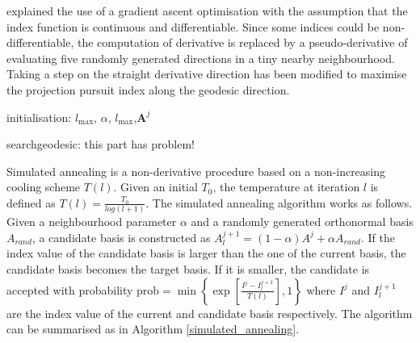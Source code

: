 \documentclass[12pt]{article}
\begin{document}
\citet{cook1995grand} explained the use of a gradient ascent
optimisation with the assumption that the index function is continuous
and differentiable. Since some indices could be non-differentiable, the
computation of derivative is replaced by a pseudo-derivative of
evaluating five randomly generated directions in a tiny nearby
neighbourhood. Taking a step on the straight derivative direction has
been modified to maximise the projection pursuit index along the
geodesic direction.

\newpage
\begin{algorithm}[H]
\SetAlgoLined
  initialisation: $l_{\max}$, $\alpha$, $l_{\max}$,$\mathbf{A}^j$\;
  \caption{searchgeodesic: this part has problem!}
  \label{search_geodesic}
\end{algorithm}

Simulated annealing
\citep[\citet{kirkpatrick1983optimization}]{bertsimas1993simulated} is a
non-derivative procedure based on a non-increasing cooling scheme
\(T(l)\). Given an initial \(T_0\), the temperature at iteration \(l\)
is defined as \(T(l) = \frac{T_0}{log(l + 1)}\). The simulated annealing
algorithm works as follows. Given a neighbourhood parameter \(\alpha\)
and a randomly generated orthonormal basis \(A_{rand}\), a candidate
basis is constructed as
\(A^{j+1}_l = (1 - \alpha)A^{j} + \alpha A_{rand}\). If the index value
of the candidate basis is larger than the one of the current basis, the
candidate basis becomes the target basis. If it is smaller, the
candidate is accepted with probability
\(\text{prob} = \min\left\{\exp\left[\frac{I^j - I^{j+1}_l}{T(l)}\right],1\right\}\)
where \(I^j\) and \(I^{j+1}_l\) are the index value of the current and
candidate basis respectively. The algorithm can be summarised as in
Algorithm \ref{simulated_annealing}.
\end{document}
